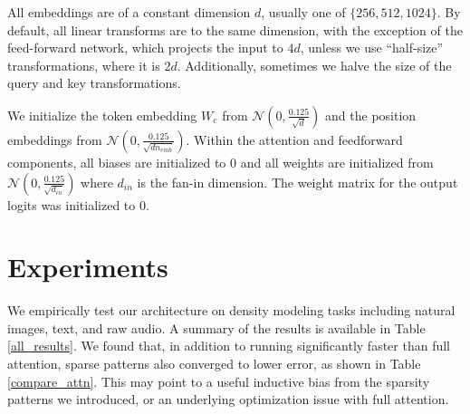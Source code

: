 \documentclass{article}
\begin{document}
All embeddings are of a constant dimension $d$, usually one of $\{256, 512, 1024\}$. By default, all linear transforms are to the same dimension, with the exception of the feed-forward network, which projects the input to $4d$, unless we use ``half-size'' transformations, where it is $2d$. Additionally, sometimes we halve the size of the query and key transformations.

We initialize the token embedding $W_e$ from $\mathcal{N}(0, \frac{0.125}{\sqrt{d}})$ and the position embeddings from $\mathcal{N}(0, \frac{0.125}{\sqrt{dn_{emb}}})$. Within the attention and feedforward components, all biases are initialized to 0 and all weights are initialized from $\mathcal{N}(0, \frac{0.125}{\sqrt{d_{in}}})$ where $d_{in}$ is the fan-in dimension. The weight matrix for the output logits was initialized to 0.


\section{Experiments}
We empirically test our architecture on density modeling tasks including natural images, text, and raw audio. A summary of the results is available in Table \ref{all_results}. We found that, in addition to running significantly faster than full attention, sparse patterns also converged to lower error, as shown in Table \ref{compare_attn}. This may point to a useful inductive bias from the sparsity patterns we introduced, or an underlying optimization issue with full attention.
\end{document}
